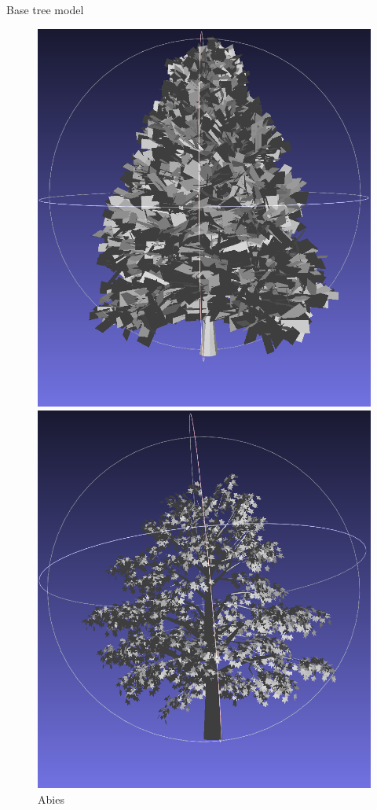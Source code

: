 \documentclass[12pt]{beamer}
\begin{document}
\begin{frame}{Base tree model}
  \begin{figure}[H]
    \centering
    \begin{minipage}{0.24\textwidth}
        \centering
        \includegraphics[width=\textwidth]{images/abies.png}
        \caption{Abies}
    \end{minipage}\hfill
    \begin{minipage}{0.24\textwidth}
        \centering
        \includegraphics[width=\textwidth]{images/acer.png}

\end{minipage}
\end{figure}
\end{frame}
\end{document}
